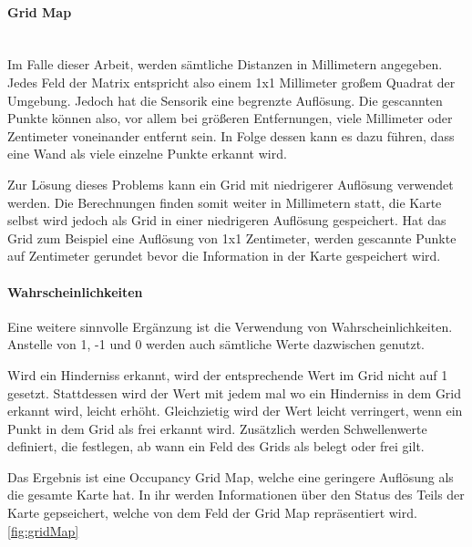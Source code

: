 \paragraph{Grid Map} \mbox{}\\
Im Falle dieser Arbeit, werden sämtliche Distanzen in Millimetern angegeben.
Jedes Feld der Matrix entspricht also einem 1x1 Millimeter großem Quadrat der Umgebung.
Jedoch hat die Sensorik eine begrenzte Auflösung.
Die gescannten Punkte können also, vor allem bei größeren Entfernungen, viele Millimeter oder Zentimeter voneinander entfernt sein.
In Folge dessen kann es dazu führen, dass eine Wand als viele einzelne Punkte erkannt wird.

Zur Lösung dieses Problems kann ein Grid mit niedrigerer Auflösung verwendet werden.
Die Berechnungen finden somit weiter in Millimetern statt, die Karte selbst wird jedoch als Grid in einer niedrigeren Auflösung gespeichert.
Hat das Grid zum Beispiel eine Auflösung von 1x1 Zentimeter, werden gescannte Punkte auf Zentimeter gerundet bevor die Information in der Karte gespeichert wird.

\paragraph{Wahrscheinlichkeiten}
Eine weitere sinnvolle Ergänzung ist die Verwendung von Wahrscheinlichkeiten.
Anstelle von 1, -1 und 0 werden auch sämtliche Werte dazwischen genutzt.

Wird ein Hinderniss erkannt, wird der entsprechende Wert im Grid nicht auf 1 gesetzt.
Stattdessen wird der Wert mit jedem mal wo ein Hinderniss in dem Grid erkannt wird, leicht erhöht.
Gleichzietig wird der Wert leicht verringert, wenn ein Punkt in dem Grid als frei erkannt wird.
Zusätzlich werden Schwellenwerte definiert, die festlegen, ab wann ein Feld des Grids als belegt oder frei gilt.

Das Ergebnis ist eine Occupancy Grid Map, welche eine geringere Auflösung als die gesamte Karte hat.
In ihr werden Informationen über den Status des Teils der Karte gepseichert, welche von dem Feld der Grid Map repräsentiert wird.
\ref{fig:gridMap}

